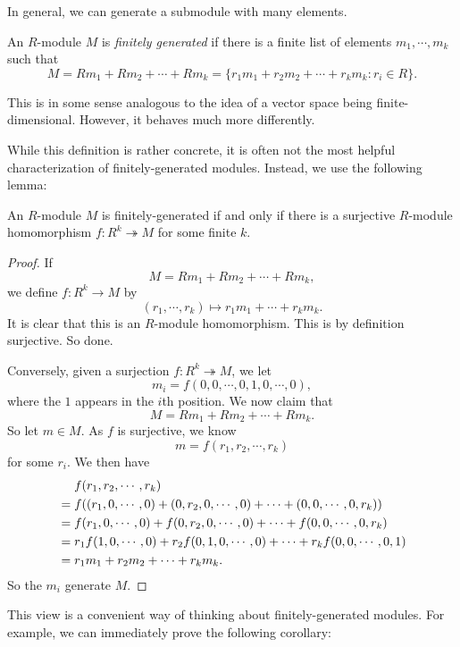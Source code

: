 \documentclass[a4paper]{article}
\begin{document}
In general, we can generate a submodule with many elements.
\begin{defi}
  An $R$-module $M$ is \emph{finitely generated} if there is a finite list of elements $m_1, \cdots, m_k$ such that
  \[
    M = Rm_1 + Rm_2 + \cdots + Rm_k = \{r_1 m_1 + r_2 m_2 + \cdots + r_k m_k: r_i \in R\}.
  \]
\end{defi}
This is in some sense analogous to the idea of a vector space being finite-dimensional. However, it behaves much more differently.

While this definition is rather concrete, it is often not the most helpful characterization of finitely-generated modules. Instead, we use the following lemma:
\begin{lemma}
  An $R$-module $M$ is finitely-generated if and only if there is a surjective $R$-module homomorphism $f: R^k \twoheadrightarrow M$ for some finite $k$.
\end{lemma}

\begin{proof}
  If
  \[
    M = R m_1 + R m_2 + \cdots + R m_k,
  \]
  we define $f: R^k \to M$ by
  \[
    (r_1, \cdots, r_k) \mapsto r_1 m_1 + \cdots + r_k m_k.
  \]
  It is clear that this is an $R$-module homomorphism. This is by definition surjective. So done.

  Conversely, given a surjection $f: R^k \twoheadrightarrow M$, we let
  \[
    m_i = f(0, 0, \cdots, 0, 1, 0, \cdots, 0),
  \]
  where the $1$ appears in the $i$th position. We now claim that
  \[
    M = R m_1 + R m_2 + \cdots + R m_k.
  \]
  So let $m \in M$. As $f$ is surjective, we know
  \[
    m = f(r_1, r_2, \cdots, r_k)
  \]
  for some $r_i$. We then have
  \begin{align*}
    &\hphantom{{}={}}f(r_1, r_2, \cdots, r_k)\\
    &= f((r_1, 0, \cdots, 0) + (0, r_2, 0, \cdots, 0) + \cdots + (0, 0, \cdots, 0, r_k))\\
    &= f(r_1, 0, \cdots, 0) + f(0, r_2, 0, \cdots, 0) + \cdots + f(0, 0, \cdots, 0, r_k)\\
    &= r_1 f(1, 0, \cdots, 0) + r_2 f(0, 1, 0, \cdots, 0) + \cdots + r_k f(0, 0, \cdots, 0, 1)\\
    &= r_1 m_1 + r_2 m_2 + \cdots + r_k m_k.
  \end{align*}
  So the $m_i$ generate $M$.
\end{proof}
This view is a convenient way of thinking about finitely-generated modules. For example, we can immediately prove the following corollary:
\end{document}
